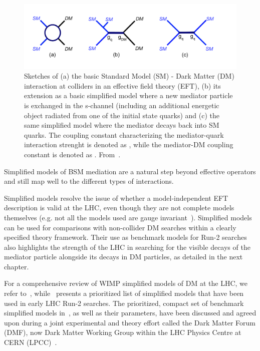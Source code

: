 \begin{figure}[!htpb]
\includegraphics[width=\textwidth]{figures/MonoX.pdf}
\caption{Sketches of (a) the basic Standard Model (SM) - Dark Matter (DM) interaction at colliders in an effective field theory (EFT), (b) its extension as a basic simplified model where a new mediator particle is exchanged in the s-channel (including an additional energetic object radiated from one of the initial state quarks) and (c) the same simplified model where the mediator decays back into SM quarks. The coupling constant characterizing the mediator-quark interaction strenght is denoted as \gq, while the mediator-DM coupling constant is denoted as \gdm. From~\cite{monoXfig}.}
\label{fig:monoX}
\end{figure}

Simplified models of BSM mediation are a natural step beyond effective operators and still map well to the different types of interactions. 

Simplified models resolve the issue of whether a model-independent EFT description is valid at the LHC, even though they are not complete models themselves (e.g. not all the models used are gauge invariant~\cite{Kahlhoefer:2015bea}). Simplified models can be used for comparisons with non-collider DM searches within a clearly specified theory framework. Their use as benchmark models for Run-2 searches also highlights the strength of the LHC in searching for the visible decays of the mediator particle alongside its decays in DM particles, as detailed in the next chapter. 

For a comprehensive review of WIMP simplified models of DM at the LHC, we refer to~\cite{Arcadi:2017kky}, while~\cite{Abercrombie:2015wmb} presents a prioritized list of simplified models that have been used in early LHC Run-2 searches. The prioritized, compact set of benchmark simplified models in~\cite{Abercrombie:2015wmb}, as well as their parameters, have been discussed and agreed upon during a joint experimental and theory effort called the Dark Matter Forum (DMF), now Dark Matter Working Group within the LHC Physics Centre at CERN (LPCC)~\cite{DMWG}. 

